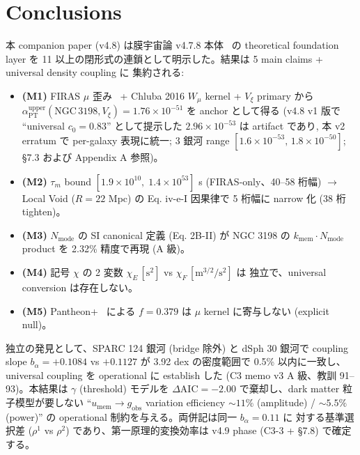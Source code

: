 \documentclass[11pt,a4paper]{ltjsarticle}
\newcommand{\kmem}{k_{\mathrm{mem}}}
\newcommand{\Vxi}{V_{\xi}}
\newcommand{\Nmode}{N_{\mathrm{mode}}}
\newcommand{\aPT}{\alpha_{\mathrm{PT}}}
\newcommand{\taum}{\tau_{m}}
\newcommand{\bal}{b_{\alpha}}
\newcommand{\umem}{u_{\mathrm{mem}}}
\newcommand{\Wmu}{W_{\mu}}
\newcommand{\gobs}{g_{\mathrm{obs}}}
\newcommand{\AIC}{\Delta\mathrm{AIC}}
\begin{document}
\section{Conclusions}

本 companion paper (v4.8) は膜宇宙論 v4.7.8 本体~\citep{Sakaguchi2026a} の theoretical foundation
layer を 11 以上の閉形式の連鎖として明示した。結果は 5 main claims + universal density coupling に
集約される:

\begin{itemize}[leftmargin=*,itemsep=3pt]
\item \textbf{(M1)} FIRAS $\mu$ 歪み~\citep{Fixsen1996} + Chluba 2016 $\Wmu$ kernel + $\Vxi$ primary から
$\aPT^{\mathrm{upper}}(\mathrm{NGC\,3198}, \Vxi) = 1.76 \times 10^{-51}$ を anchor として得る
(v4.8 v1 版で ``universal $c_0 = 0.83$'' として提示した $2.96 \times 10^{-53}$ は artifact であり,
本 v2 erratum で per-galaxy 表現に統一; 3 銀河 range $[1.6\times10^{-53},\,1.8\times10^{-50}]$; \S 7.3 および Appendix A 参照)。

\item \textbf{(M2)} $\taum$ bound $[1.9 \times 10^{10},\; 1.4 \times 10^{53}]$ s (FIRAS-only、40--58 桁幅)
$\to$ Local Void ($R = 22$ Mpc) の Eq. iv-e-I 因果律で 5 桁幅に narrow 化 (38 桁 tighten)。

\item \textbf{(M3)} $\Nmode$ の SI canonical 定義 (Eq. 2B-II) が NGC 3198 の
$\kmem \cdot \Nmode$ product を 2.32\% 精度で再現 (A 級)。

\item \textbf{(M4)} 記号 $\chi$ の 2 変数 $\chi_E\,[\mathrm{s}^2]$ vs $\chi_F\,[\mathrm{m}^{3/2}/\mathrm{s}^2]$ は
独立で、universal conversion は存在しない。

\item \textbf{(M5)} Pantheon+~\citep{Scolnic2022} による $f = 0.379$ は $\mu$ kernel に寄与しない
(explicit null)。
\end{itemize}

独立の発見として、SPARC 124 銀河 (bridge 除外) と dSph 30 銀河で coupling slope
$\bal = +0.1084$ vs $+0.1127$ が 3.92 dex の密度範囲で 0.5\% 以内に一致し、universal coupling を
operational に establish した (C3 memo v3 A 級、教訓 91--93)。本結果は $\gamma$ (threshold) モデルを
$\AIC = -2.00$ で棄却し、dark matter 粒子模型が要しない ``$\umem \to \gobs$ variation efficiency
$\sim 11\%$ (amplitude) / $\sim 5.5\%$ (power)'' の operational 制約を与える。両併記は同一 $\bal = 0.11$ に
対する基準選択差 ($\rho^1$ vs $\rho^2$) であり、第一原理的変換効率は v4.9 phase (C3-3 + \S 7.8) で確定する。
\end{document}
